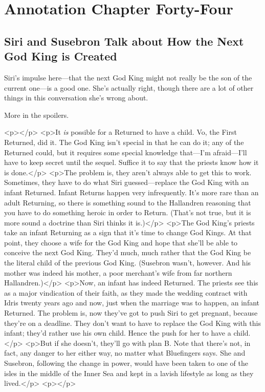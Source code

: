 \section{Annotation Chapter Forty-Four}

\subsection*{Siri and Susebron Talk about How the Next God King is Created}

Siri’s impulse here—that the next God King might not really be the son of the current one—is a good one. She’s actually right, though there are a lot of other things in this conversation she’s wrong about.

More in the spoilers.



<p></p>
<p>It \textit{is} possible for a Returned to have a child. Vo, the First Returned, did it. The God King isn’t special in that he can do it; any of the Returned could, but it requires some special knowledge that—I’m afraid—I’ll have to keep secret until the sequel. Suffice it to say that the priests know how it is done.</p>
<p>The problem is, they aren’t always able to get this to work. Sometimes, they have to do what Siri guessed—replace the God King with an infant Returned. Infant Returns happen very infrequently. It’s more rare than an adult Returning, so there is something sound to the Hallandren reasoning that you have to do something heroic in order to Return. (That’s not true, but it is more sound a doctrine than Siri thinks it is.)</p>
<p>The God King’s priests take an infant Returning as a sign that it’s time to change God Kings. At that point, they choose a wife for the God King and hope that she’ll be able to conceive the next God King. They’d much, much rather that the God King be the literal child of the previous God King. (Susebron wasn’t, however. And his mother was indeed his mother, a poor merchant’s wife from far northern Hallandren.)</p>
<p>Now, an infant has indeed Returned. The priests see this as a major vindication of their faith, as they made the wedding contract with Idris twenty years ago and now, just when the marriage was to happen, an infant Returned. The problem is, now they’ve got to push Siri to get pregnant, because they’re on a deadline. They don’t want to have to replace the God King with this infant; they’d rather use his own child. Hence the push for her to have a child.</p>
<p>But if she doesn’t, they’ll go with plan B. Note that there’s not, in fact, any danger to her either way, no matter what Bluefingers says. She and Susebron, following the change in power, would have been taken to one of the isles in the middle of the Inner Sea and kept in a lavish lifestyle as long as they lived.</p>
<p></p>

